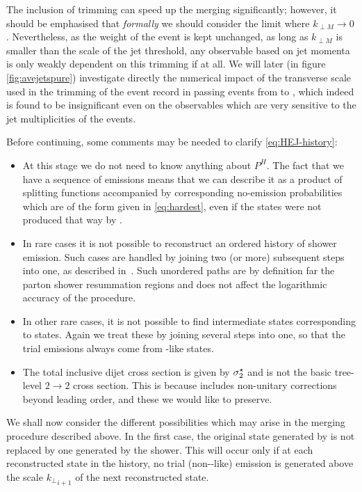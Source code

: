 The inclusion of trimming can speed up the merging significantly;
however, it should be emphasised that \textit{formally} we should consider the 
limit where $k_{\perp M}\to 0$. Nevertheless, as the weight of the event is kept unchanged,
as long as $k_{\perp M}$ is smaller than the scale of the jet threshold, any observable
based on jet momenta is only weakly dependent on this trimming if at
all. We will later (in figure \ref{fig:avejetspure})
investigate directly the numerical impact of the transverse scale used in the
trimming of the event record in passing events from \HEJ to \pyt, which
indeed is found to be insignificant even on the observables which are very
sensitive to the jet multiplicities of the events.

Before continuing,
some comments may be needed to clarify \cref{eq:HEJ-history}:
\begin{itemize}\itemsep 0mm
\item At this stage we do not need to know anything about $P^H$. The
  fact that we have a sequence of emissions means that we can describe
  it as a product of splitting functions accompanied by corresponding
  no-emission probabilities which are of the form given in
  \cref{eq:hardest}, even if the states were not produced that way by
  \HEJ.
\item In rare cases it is not possible to reconstruct an ordered
  history of shower emission. Such cases are handled by joining two
  (or more) subsequent steps into one, as described
  in~\cite{Lonnblad:2011xx}. Such unordered paths are by definition
  far the parton shower resummation regions and does not affect the
  logarithmic accuracy of the procedure.
\item In other rare cases, it is not possible to find intermediate
  states corresponding to \HEJ states. Again we treat these by joining
  several steps into one, so that the trial emissions always come
  from \HEJ-like states.
\item The total inclusive dijet cross section is given by $\sigma_2^{\star}$ and
  is not the basic tree-level $2\to2$ cross section. This is because
  \HEJ includes non-unitary corrections beyond leading order, and
  these we would like to preserve.
\end{itemize}
We shall now consider the different possibilities which may arise in the merging procedure described above.
In the first case, the original state generated by \HEJ is not replaced by one
generated by the shower. This will occur only if at each reconstructed state in the history,
no trial (non-\HEJ-like) emission is generated above the scale ${k_\perp}_{i+1}$ of the next reconstructed state.

